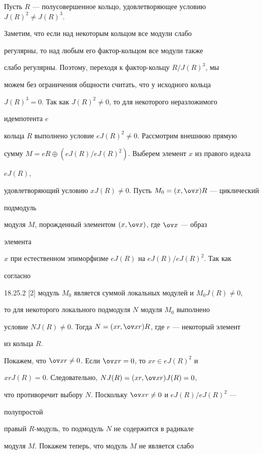 \begin{pf} 


Пусть $R$ --- полусовершенное кольцо, удовлетворяющее условию $J(R)^2\ne 


J(R)^3$. 


Заметим, что если над некоторым кольцом все модули слабо 


регулярны, то над любым его фактор-кольцом все модули также 


слабо регулярны. Поэтому, переходя к фактор-кольцу $R/J(R)^3$, мы 


можем без ограничения общности считать, что у исходного кольца 


$J(R)^3=0$. Так как $J(R)^2\ne0$, то для некоторого неразложимого 


идемпотента $e$ 


кольца $R$ выполнено условие $eJ(R)^2\ne0$. Рассмотрим внешнюю прямую 


сумму $M=eR\oplus(eJ(R)/eJ(R)^2)$. Выберем элемент $x$ из правого идеала 


$eJ(R)$, 


удовлетворяющий условию $xJ(R)\ne0$. Пусть $M_0=(x,\ov x)R$ --- циклический 


подмодуль 


модуля $M$, порожденный элементом $(x,\ov x)$, где $\ov x$ --- образ 


элемента 


$x$ при естественном эпиморфизме $eJ(R)$ на $eJ(R)/eJ(R)^2$. Так как 


согласно 


18.25.2 [2] модуль $M_0$ является суммой локальных модулей и $M_0J(R)\ne0$, 


то для некоторого локального подмодуля $N$ модуля $M_0$ выполнено 


условие $NJ(R)\ne0$. Тогда $N=(xr,\ov xr)R$, где $r$ --- некоторый элемент 


из кольца $R$. 


Покажем, что $\ov xr\ne0$. Если $\ov xr=0$, то $xr\in eJ(R)^2$ и 


$xrJ(R)=0$. Следовательно, $NJ(R)=(xr,\ov xr)J(R)=0$, 


что противоречит выбору $N$. Поскольку $\ov xr\ne0$ и $eJ(R)/eJ(R)^2$ --- 


полупростой 


правый $R$-модуль, то подмодуль $N$ не содержится в радикале 


модуля $M$. Покажем теперь, что модуль $M$ не является слабо 



\end{pf}
